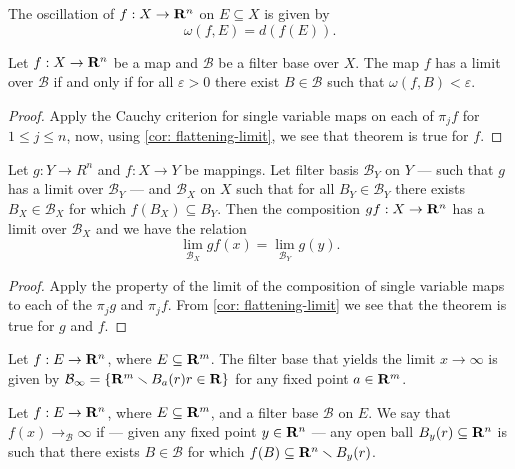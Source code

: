 \begin{definition}[Oscillation]
    The oscillation of \(f: X \to \mathbf{R}^n\) on \(E \subseteq X\) is given by
    \[
        \omega(f, E) = d(f(E)).
    \]
\end{definition}

\begin{theorem}
    \label{thm: cauchy-criterion several}
    Let \(f: X \to \mathbf{R}^n\) be a map and \(\mathcal B\) be a filter base over \(X\).
    The map \(f\) has a limit over \(\mathcal B\) if and only if for all
    \(\varepsilon > 0\) there exist \(B \in \mathcal B\) such that \(\omega(f, B)
    < \varepsilon\).
\end{theorem}

\begin{proof}
    Apply the Cauchy criterion for single variable maps on each of \(\pi_j  f\) for
    \(1 \leq j \leq n\), now, using \cref{cor: flattening-limit}, we see that theorem
    is true for \(f\).
\end{proof}

\begin{theorem}
    Let \(g: Y \to R^n\) and \(f: X \to Y\) be mappings. Let filter basis
    \(\mathcal B_Y\) on \(Y\) --- such that \(g\) has a limit over \(\mathcal
    B_Y\) --- and \(\mathcal B_X\) on \(X\) such that for all \(B_Y \in \mathcal
    B_Y\) there exists \(B_X \in \mathcal B_X\) for which \(f(B_X) \subseteq
    B_Y\). Then the composition \(g  f: X \to \mathbf{R}^n\) has a limit over
    \(\mathcal B_X\) and we have the relation
    \[
        \lim_{\mathcal B_X} g  f (x) = \lim_{\mathcal B_Y} g(y).
    \]
\end{theorem}

\begin{proof}
    Apply the property of the limit of the composition of single variable maps to
    each of the \(\pi_j  g\) and \(\pi_j  f\). From \cref{cor: flattening-limit} we
    see that the theorem is true for \(g\) and \(f\).
\end{proof}

\begin{definition}
    Let \(f: E \to \mathbf{R}^n\), where \(E \subseteq \mathbf{R}^m\). The filter base that yields
    the limit \(x \to \infty\) is given by \(\mathcal B_\infty = \{\mathbf{R}^m \smallsetminus
    B_a(r) \relax r \in \mathbf{R}\}\) for any fixed point \(a \in \mathbf{R}^m\).
\end{definition}

\begin{definition}
    Let \(f: E \to \mathbf{R}^n\), where \(E \subseteq \mathbf{R}^m\), and a filter base
    \(\mathcal B\) on \(E\). We say that \(f(x) \to_\mathcal{B} \infty\) if ---
    given any fixed point \(y \in \mathbf{R}^n\) --- any open ball \(B_y(r) \subseteq
    \mathbf{R}^n\) is such that there exists \(B \in \mathcal B\) for which \(f(B)
    \subseteq \mathbf{R}^n \smallsetminus B_y(r)\).
\end{definition}

